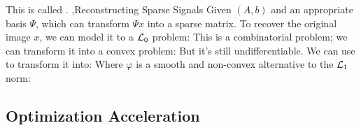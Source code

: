 \documentclass[10pt]{report}
\begin{document}
This is called .
\sep{Reconstructing Sparse Signals}
Given $(A,b)$ and an appropriate basis $\Psi$, which can transform $\Psi x$ into a sparse matrix. To recover the original image $x$,
we can model it to a $\mathcal{L}_0$ problem:
This is a combinatorial problem; we can transform it into a convex problem:
But it's still undifferentiable. We can use  to transform it into:
Where $\varphi$ is a smooth and non-convex alternative to the $\mathcal{L}_1$ norm:

\subsection{Optimization Acceleration}
\end{document}
